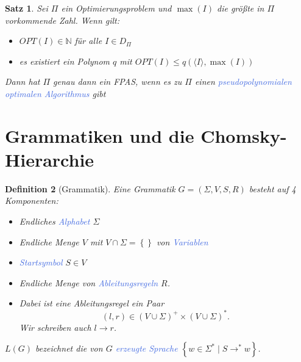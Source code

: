 \documentclass[11pt]{scrartcl}
\newcommand{\tcol}[1]{\textcolor{RoyalBlue}{#1}}
\newcommand{\set}[1]{\left\lbrace #1\right\rbrace}
\theoremstyle{break}
\newtheorem{satz}{Satz}[section]
\newtheorem{defi}[satz]{Definition}
\begin{document}
    \begin{satz}
        Sei $\Pi$ ein Optimierungsproblem und $\max(I)$ die größte in $\Pi$ vorkommende Zahl.
        Wenn gilt:
        \begin{itemize}
            \item $OPT(I)\in\mathbb{N}$ für alle $I\in D_\Pi$
            \item es existiert ein Polynom $q$ mit $OPT(I)\leq q(\langle I\rangle,\max(I))$
        \end{itemize}
        Dann hat $\Pi$ genau dann ein FPAS, wenn es zu $\Pi$ einen \tcol{pseudopolynomialen optimalen Algorithmus} gibt
    \end{satz}



    \section{Grammatiken und die Chomsky-Hierarchie}
	\label{sec:grammatiken-und-die-chomsky-hierarchieindex}


    \begin{defi}[Grammatik]
        Eine Grammatik $G=(\Sigma,V,S,R)$ besteht auf 4 Komponenten:
        \begin{itemize}
            \item Endliches \tcol{Alphabet} $\Sigma$
            \item Endliche Menge $V$ mit $V\cap\Sigma=\set{}$ von \tcol{Variablen}
            \item \tcol{Startsymbol} $S\in V$
            \item Endliche Menge von \tcol{Ableitungsregeln} $R$.
            \item Dabei ist eine Ableitungsregel ein Paar \[(l,r)\in(V\cup\Sigma)^+\times(V\cup\Sigma)^*.\]
            Wir schreiben auch $l\rightarrow r$.
        \end{itemize}
        $L(G)$ bezeichnet die von $G$ \tcol{erzeugte Sprache} $\set{w\in\Sigma^*\mid S\rightarrow^*w}$.
    \end{defi}
\end{document}

